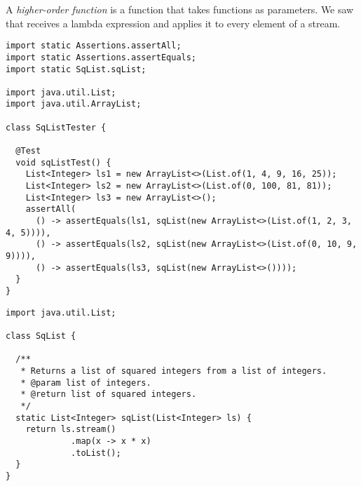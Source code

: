 A \textit{higher-order function} is a function that takes functions as parameters. We saw that  receives a lambda expression and applies it to every element of a stream. 


\begin{cl}[]{}
\begin{lstlisting}[language=MyJava]
import static Assertions.assertAll;
import static Assertions.assertEquals;
import static SqList.sqList;

import java.util.List;
import java.util.ArrayList;

class SqListTester {

  @Test
  void sqListTest() {
    List<Integer> ls1 = new ArrayList<>(List.of(1, 4, 9, 16, 25));
    List<Integer> ls2 = new ArrayList<>(List.of(0, 100, 81, 81));
    List<Integer> ls3 = new ArrayList<>();
    assertAll(
      () -> assertEquals(ls1, sqList(new ArrayList<>(List.of(1, 2, 3, 4, 5)))),
      () -> assertEquals(ls2, sqList(new ArrayList<>(List.of(0, 10, 9, 9)))),
      () -> assertEquals(ls3, sqList(new ArrayList<>())));
  }
}
\end{lstlisting}    
\end{cl}

\begin{cl}[]{}
\begin{lstlisting}[language=MyJava]
import java.util.List;

class SqList {

  /**
   * Returns a list of squared integers from a list of integers.
   * @param list of integers.
   * @return list of squared integers.
   */
  static List<Integer> sqList(List<Integer> ls) {
    return ls.stream()
             .map(x -> x * x)
             .toList();
  }
}
\end{lstlisting}    
\end{cl}



